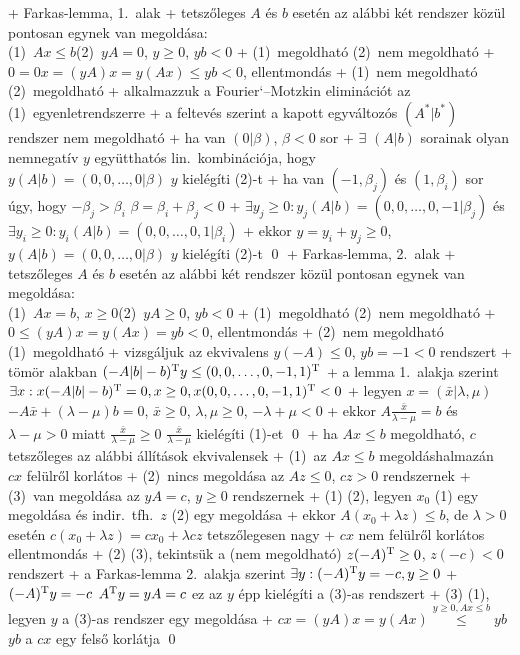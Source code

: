 
+ \lemma Farkas-lemma, 1.~alak
  + tetszőleges $A$ és $b$ esetén az alábbi két rendszer közül
    pontosan egynek van megoldása:\\
    (1)~$Ax \le b$\qquad(2)~$yA = 0$, $y \ge 0$, $yb < 0$
+ \proof (1)~megoldható \RA (2)~nem megoldható
  + $0 = 0x = (yA) x = y (Ax) \le yb < 0$, ellentmondás
+ (1)~nem megoldható \RA (2)~megoldható
  + alkalmazzuk a Fourier`--Motzkin eliminációt az
    (1)~egyenletrendszerre
  + a feltevés szerint a kapott egyváltozós $(A^*|b^*)$ rendszer nem
    megoldható
    + ha van $(0|\beta)$, $\beta < 0$ sor
      + $\exists$ $(A|b)$ sorainak olyan nemnegatív $y$ együtthatós
      lin.~kombinációja, hogy\\
        $y (A|b) = (0, 0, \ldots, 0|\beta)$ \RA $y$ kielégíti (2)-t
    + ha van $(-1, \beta_j)$ és $(1,\beta_i)$ sor úgy, hogy $-\beta_j >
    \beta_i$ \RA $\beta = \beta_i + \beta_j < 0$
      + $\exists y_j \ge 0: y_j (A|b) = (0, 0, \ldots, 0, -1 | \beta_j)$
        és $\exists y_i \ge 0: y_i (A|b) = (0, 0, \ldots, 0, 1 | \beta_i)$
      + ekkor $y = y_i + y_j \ge 0$, $y (A|b)
      = (0, 0, \ldots, 0 | \beta)$ \RA $y$ kielégíti (2)-t \qed
+ \lemma Farkas-lemma, 2.~alak
  + tetszőleges $A$ és $b$ esetén az alábbi két rendszer közül
    pontosan egynek van megoldása:\\
    (1)~$Ax = b$, $x \ge 0$\qquad(2)~$yA \ge 0$, $yb < 0$
  + \proof (1)~megoldható \RA (2)~nem megoldható
    + $0 \le (yA)x = y(Ax) = yb < 0$, ellentmondás
  + (2)~nem megoldható \RA (1)~megoldható
    + vizsgáljuk az ekvivalens $y(-A) \le 0$, $yb = -1 < 0$  rendszert
    + tömör alakban $(-A|b|-b)^{\mathrm{T}} y \le (0, 0, \ldots, 0, -1, 1)^{\mathrm{T}}$
    + a lemma 1.~alakja szerint $\exists x: x (-A|b|-b)^{\mathrm{T}} = 0, x
      \ge 0, x (0, 0, \ldots, 0, -1, 1)^{\mathrm{T}} < 0$
    + legyen $x = (\bar{x} | \lambda, \mu)$ \RA $-A\bar{x} + (\lambda -
      \mu)b = 0$, $\bar{x} \ge 0$, $\lambda, \mu \ge 0$, $-\lambda +
      \mu < 0$
    + ekkor $A\frac{\bar{x}}{\lambda - \mu} = b$ és $\lambda - \mu > 0$
      miatt $\frac{\bar{x}}{\lambda - \mu} \ge 0$ \RA%
      $\frac{\bar{x}}{\lambda - \mu}$ kielégíti (1)-et \qed
+ \thm \label{thm:linprog:farkas:3kalicka}ha $Ax \le b$ megoldható,
  $c$ tetszőleges \RA az alábbi állítások ekvivalensek
  + (1)~az $Ax \le b$ megoldáshalmazán $cx$ felülről korlátos
  + (2)~nincs megoldása az $Az \le 0$, $cz > 0$ rendszernek
  + (3)~van megoldása az $yA = c$, $y \ge 0$ rendszernek
  + \proof (1) \RA (2), legyen $x_0$ (1) egy megoldása és
    indir.~tfh.~$z$ (2) egy megoldása
    + ekkor $A(x_0 + \lambda z) \le b$, de $\lambda > 0$ esetén
      $c(x_0 + \lambda z) = c x_0 + \lambda c z$ tetszőlegesen nagy
    + $cx$ nem felülről korlátos \RA ellentmondás
  + (2) \RA (3), tekintsük a (nem megoldható) $z (-A)^{\mathrm{T}} \ge 0$, $z
    (-c) < 0$ rendszert
    + a Farkas-lemma 2.~alakja szerint $\exists y: (-A)^{\mathrm{T}} y = -c, y \ge 0$
    + $(-A)^{\mathrm{T}} y = -c$ \RA $A^{\mathrm{T}} y = y A = c$ \RA ez az $y$ épp
      kielégíti a (3)-as rendszert
  + (3) \RA (1), legyen $y$ a (3)-as rendszer egy megoldása
    + $cx = (yA)x = y (Ax) \overset{y \ge 0, Ax \le b}{\le} yb$ \RA%
    $yb$ a $cx$ egy felső korlátja \qed

